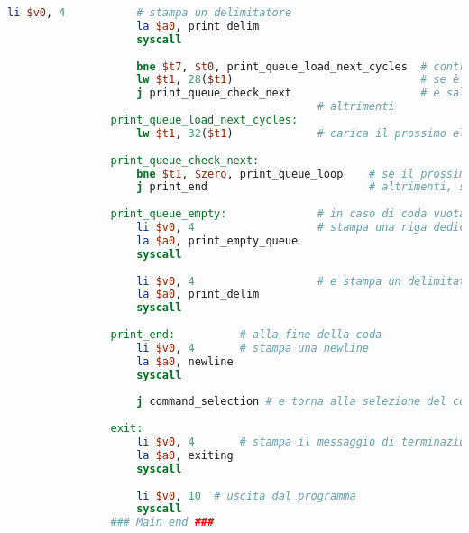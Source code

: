 \begin{center}
\begin{lstlisting}[language=mips, gobble=14, stepnumber=1]
                    li $v0, 4           # stampa un delimitatore
                    la $a0, print_delim
                    syscall
                    
                    bne $t7, $t0, print_queue_load_next_cycles  # controlla la politica di scheduling attuale
                    lw $t1, 28($t1)                             # se è A, carica il prossimo elemento della lista A
                    j print_queue_check_next                    # e salta al controllo del prossimo elemento
                                                # altrimenti
                print_queue_load_next_cycles:
                    lw $t1, 32($t1)             # carica il prossimo elemento della lista B
                    
                print_queue_check_next:
                    bne $t1, $zero, print_queue_loop    # se il prossimo elemento non è nullo, esegui un altro ciclo
                    j print_end                         # altrimenti, salta alla fine della stampa
                    
                print_queue_empty:              # in caso di coda vuota
                    li $v0, 4                   # stampa una riga dedicata
                    la $a0, print_empty_queue
                    syscall
                    
                    li $v0, 4                   # e stampa un delimitatore
                    la $a0, print_delim
                    syscall
                    
                print_end:          # alla fine della coda
                    li $v0, 4       # stampa una newline
                    la $a0, newline
                    syscall
                    
                    j command_selection # e torna alla selezione del comando
                    
                exit:
                    li $v0, 4       # stampa il messaggio di terminazione
                    la $a0, exiting
                    syscall
                    
                    li $v0, 10  # uscita dal programma
                    syscall
                ### Main end ###\end{lstlisting}
        \end{center}
